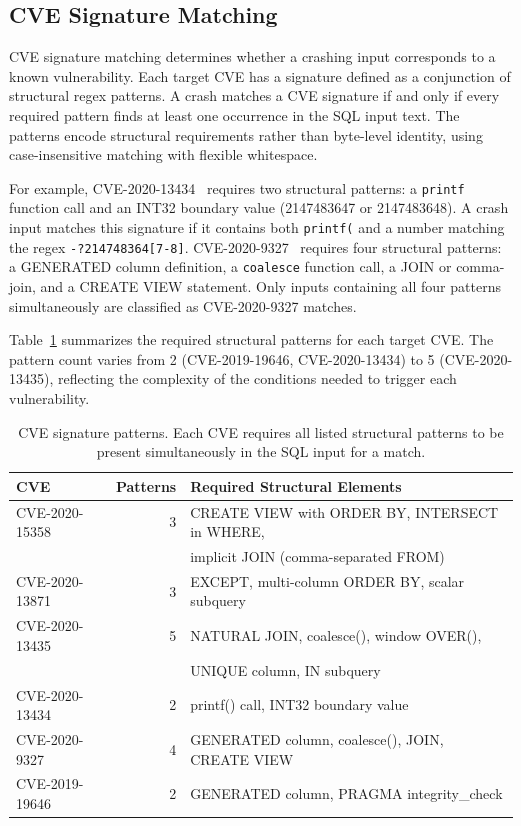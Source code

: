 \subsection{CVE Signature Matching}

CVE signature matching determines whether a crashing input corresponds to a known vulnerability. Each target CVE has a signature defined as a conjunction of structural regex patterns. A crash matches a CVE signature if and only if every required pattern finds at least one occurrence in the SQL input text. The patterns encode structural requirements rather than byte-level identity, using case-insensitive matching with flexible whitespace.

For example, CVE-2020-13434~\cite{cve202013434} requires two structural patterns: a \texttt{printf} function call and an INT32 boundary value (2147483647 or 2147483648). A crash input matches this signature if it contains both \texttt{printf(} and a number matching the regex \texttt{-?214748364[7-8]}. CVE-2020-9327~\cite{cve20209327} requires four structural patterns: a GENERATED column definition, a \texttt{coalesce} function call, a JOIN or comma-join, and a CREATE VIEW statement. Only inputs containing all four patterns simultaneously are classified as CVE-2020-9327 matches.

Table~\ref{tab:cve-signatures} summarizes the required structural patterns for each target CVE. The pattern count varies from 2 (CVE-2019-19646, CVE-2020-13434) to 5 (CVE-2020-13435), reflecting the complexity of the conditions needed to trigger each vulnerability.

\begin{table}[htbp]
\caption{CVE signature patterns. Each CVE requires all listed structural patterns to be present simultaneously in the SQL input for a match.}
\label{tab:cve-signatures}
\centering
\begin{tabular}{lrl}
\toprule
\textbf{CVE} & \textbf{Patterns} & \textbf{Required Structural Elements} \\
\midrule
CVE-2020-15358 & 3 & CREATE VIEW with ORDER BY, INTERSECT in WHERE, \\
               &   & implicit JOIN (comma-separated FROM) \\
CVE-2020-13871 & 3 & EXCEPT, multi-column ORDER BY, scalar subquery \\
CVE-2020-13435 & 5 & NATURAL JOIN, coalesce(), window OVER(), \\
               &   & UNIQUE column, IN subquery \\
CVE-2020-13434 & 2 & printf() call, INT32 boundary value \\
CVE-2020-9327  & 4 & GENERATED column, coalesce(), JOIN, CREATE VIEW \\
CVE-2019-19646 & 2 & GENERATED column, PRAGMA integrity\_check \\
\bottomrule
\end{tabular}
\end{table}

